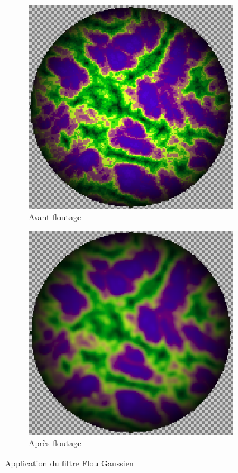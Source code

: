\documentclass[11pt]{article}
\begin{document}
\begin{figure}[H]
    \centering
    \begin{subfigure}{0.46\linewidth}
    \centering
        \includegraphics[scale=0.25]{blurInit.png}
        \caption{Avant floutage}
        \label{subfig:avantflou}
    \end{subfigure}
    \begin{subfigure}{0.46\linewidth}
    \centering
        \includegraphics[scale=0.25]{blurFinal.png}
        \caption{Après floutage}
        \label{subfig:aprèsflou}
    \end{subfigure}
    \caption{Application du filtre Flou Gaussien}
    \label{fig:gaussian_blur}
\end{figure}
\end{document}
